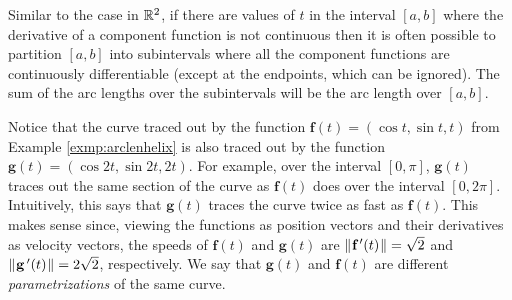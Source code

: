 Similar to the case in $\mathbb{R}^{2}$, if there are values of $t$ in the interval $[a,b]$ where the derivative of a
component function is not continuous then it is often possible to partition $[a,b]$ into subintervals where all the
component functions are continuously differentiable (except at the endpoints, which can be ignored).
The sum of the arc lengths over the subintervals will be the arc length over $[a,b]$.

Notice that the curve traced out by the function $\textbf{f}(t) = (\cos t , \sin t , t)$ from Example
\ref{exmp:arclenhelix} is also traced out by the function $\textbf{g}(t) = (\cos 2t , \sin 2t , 2t)$.
For example, over the interval $[0,\pi]$, $\textbf{g}(t)$ traces out the same section of the curve as $\textbf{f}(t)$
does over the interval $[0,2\pi]$. Intuitively, this says that $\textbf{g}(t)$ traces the curve twice as fast as
$\textbf{f}(t)$. This makes sense since, viewing the functions as position vectors and their derivatives as velocity
vectors, the speeds of $\textbf{f}(t)$ and $\textbf{g}(t)$ are $\lVert\mspace{1mu}\textbf{f}\,'(t)\mspace{1mu}\rVert = \sqrt{2}$ and
$\lVert\mspace{1mu}\textbf{g}\,'(t)\mspace{1mu}\rVert = 2\sqrt{2}$, respectively. We say that $\textbf{g}(t)$ and $\textbf{f}(t)$ are different
\emph{parametrizations} of the same curve.


\begin{center}
\end{center}

